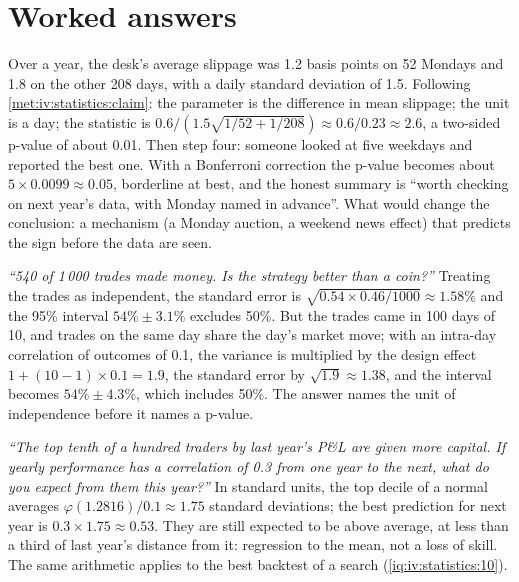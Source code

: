 \section{Worked answers}

\begin{example}\label{ex:iv:statistics:monday}
Over a year, the desk's average slippage was 1.2 basis points on 52 Mondays and 1.8 on the other 208 days, with a daily
standard deviation of 1.5. Following \cref{met:iv:statistics:claim}: the parameter is the difference in mean slippage;
the unit is a day; the statistic is $0.6/(1.5\sqrt{1/52 + 1/208}) \approx 0.6/0.23 \approx 2.6$, a two-sided p-value of
about 0.01. Then step four: someone looked at five weekdays and reported the best one. With a Bonferroni correction the
p-value becomes about $5 \times 0.0099 \approx 0.05$, borderline at best, and the honest summary is ``worth checking on
next year's data, with Monday named in advance''. What would change the conclusion: a mechanism (a Monday auction, a
weekend news effect) that predicts the sign before the data are seen.
\end{example}

\begin{example}\label{ex:iv:statistics:hit}
\emph{``540 of 1\,000 trades made money. Is the strategy better than a coin?''} Treating the trades as independent, the
standard error is $\sqrt{0.54 \times 0.46/1000} \approx 1.58\%$ and the 95\% interval $54\% \pm 3.1\%$ excludes 50\%. But
the trades came in 100 days of 10, and trades on the same day share the day's market move; with an intra-day correlation
of outcomes of 0.1, the variance is multiplied by the design effect $1 + (10 - 1) \times 0.1 = 1.9$, the standard error by
$\sqrt{1.9} \approx 1.38$, and the interval becomes $54\% \pm 4.3\%$, which includes 50\%. The answer names the unit of
independence before it names a p-value.
\end{example}

\begin{example}\label{ex:iv:statistics:decile}
\emph{``The top tenth of a hundred traders by last year's P\&L are given more capital. If yearly performance has a
correlation of 0.3 from one year to the next, what do you expect from them this year?''} In standard units, the top
decile of a normal averages $\varphi(1.2816)/0.1 \approx 1.75$ standard deviations; the best prediction for next year is
$0.3 \times 1.75 \approx 0.53$. They are still expected to be above average, at less than a third of last year's
distance from it: regression to the mean, not a loss of skill. The same arithmetic applies to the best backtest of a
search (\cref{iq:iv:statistics:10}).
\end{example}


